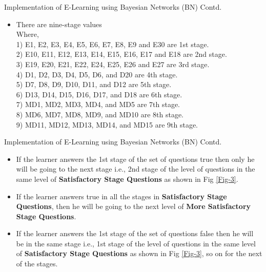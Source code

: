 \documentclass{beamer}
\begin{document}
\begin{frame}
\begin{block}{Implementation of E-Learning using Bayesian Networks (BN) Contd.}
\begin{itemize}
    \item There are nine-stage values \\
    Where, \\
    1) E1, E2, E3, E4, E5, E6, E7, E8, E9 and E30 are 1st stage. \\
    2) E10, E11, E12, E13, E14, E15, E16, E17 and E18 are 2nd stage. \\ 
    3) E19, E20, E21, E22, E24, E25, E26 and E27 are 3rd stage. \\
    4) D1, D2, D3, D4, D5, D6, and D20 are 4th stage. \\
    5) D7, D8, D9, D10, D11, and D12 are 5th stage. \\
    6) D13, D14, D15, D16, D17, and D18 are 6th stage. \\ 
    7) MD1, MD2, MD3, MD4, and MD5 are 7th stage. \\
    8) MD6, MD7, MD8, MD9, and MD10 are 8th stage. \\
    9) MD11, MD12, MD13, MD14, and MD15 are 9th stage.
\end{itemize}
\end{block}
\end{frame}

\begin{frame}
\begin{block}{Implementation of E-Learning using Bayesian Networks (BN) Contd.}
\begin{itemize}
    \item If the learner answers the 1st stage of the set of questions true then only he will be going to the next stage i.e., 2nd stage of the level of questions in the same level of \textbf{Satisfactory Stage Questions} as shown in Fig \ref{Fig-3}.
    \item If the learner answers true in all the stages in \textbf{Satisfactory Stage Questions}, then he will be going to the next level of \textbf{More Satisfactory Stage Questions}.
    \item If the learner answers the 1st stage of the set of questions false then he will be in the same stage i.e., 1st stage of the level of questions in the same level of \textbf{Satisfactory Stage Questions} as shown in Fig \ref{Fig-3}, so on for the next of the stages.
\end{itemize}
\end{block}
\end{frame}
\end{document}
